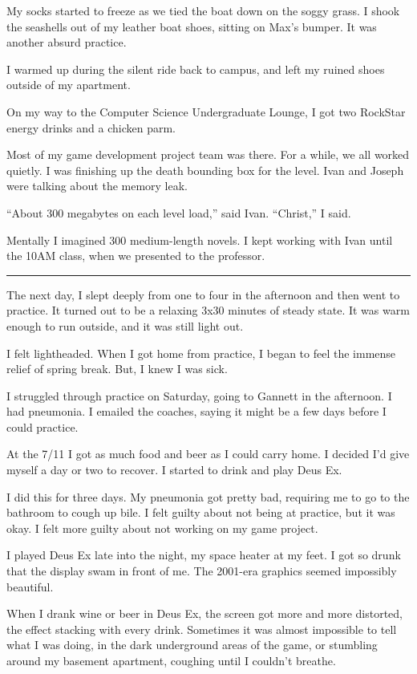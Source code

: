 My socks started to freeze as we tied the boat down on the soggy grass.  I shook
the seashells out of my leather boat shoes, sitting on Max's bumper.  It was
another absurd practice.  

I warmed up during the silent ride back to campus, and left my ruined shoes
outside of my apartment.  

On my way to the Computer Science Undergraduate Lounge, I got two RockStar
energy drinks and a chicken parm.

Most of my game development project team was there.  For a while, we all worked
quietly.  I was finishing up the death bounding box for the level.  Ivan and
Joseph were talking about the memory leak.

``About 300 megabytes on each level load,'' said Ivan.  ``Christ,'' I said.

Mentally I imagined 300 medium-length novels.  I kept working with Ivan until
the 10AM class, when we presented to the professor.

\plainfancybreak{12pt}{2}{* * *}

The next day, I slept deeply from one to four in the afternoon and then went to
practice.  It turned out to be a relaxing 3x30 minutes of steady state.  It
was warm enough to run outside, and it was still light out.

I felt lightheaded.  When I got home from practice, I began to feel the immense
relief of spring break.  But, I knew I was sick.  

I struggled through practice on Saturday, going to Gannett in the afternoon.  I
had pneumonia.  I emailed the coaches, saying it might be a few days before I
could practice.  

At the 7/11 I got as much food and beer as I could carry home.  I decided I'd
give myself a day or two to recover.  I started to drink and play Deus Ex.  

I did this for three days.  My pneumonia got pretty bad, requiring me to go to
the bathroom to cough up bile.  I felt guilty about not being at practice, but
it was okay.  I felt more guilty about not working on my game project. 
 
I played Deus Ex late into the night, my space heater at my feet.  I got so
drunk that the display swam in front of me.  The 2001-era graphics seemed
impossibly beautiful.  

When I drank wine or beer in Deus Ex, the screen got more and more distorted,
the effect stacking with every drink.  Sometimes it was almost impossible to
tell what I was doing, in the dark underground areas of the game, or stumbling
around my basement apartment, coughing until I couldn't breathe.

